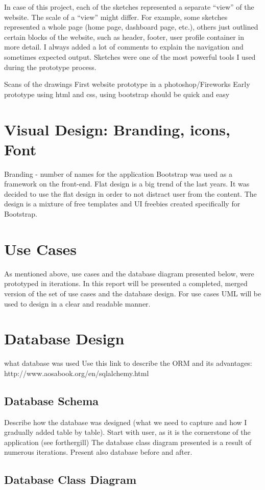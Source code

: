 In case of this project, each of the sketches represented a separate “view” of the website. The scale of a “view” might differ. For example, some sketches represented a whole page (home page, dashboard page, etc.), others just outlined certain blocks of the website, such as header, footer, user profile container in more detail. I always added a lot of comments to explain the navigation and sometimes expected output. Sketches were one of the most powerful tools I used during the prototype process. 


Scans of the drawings
First website prototype in a photoshop/Fireworks
Early prototype using html and css, using bootstrap should be quick and easy

\section{Visual Design: Branding, icons, Font}
\label{sec:visdesign}
Branding - number of names for the application
Bootstrap was used as a framework on the front-end.
Flat design is a big trend of the last years. It was decided to use the flat design in order to not distract user from the content.
The design is a mixture of free templates and UI freebies created specifically for Bootstrap.

\section{Use Cases}
\label{usecases}
As mentioned above, use cases and the database diagram presented below, were prototyped in iterations. In this report will be presented a completed, merged version of the set of use cases and the database design. For use cases UML will be used to design in a clear and readable manner.

\section{Database Design}
\label{databasedesign}
what database was used
Use this link to describe the ORM and its advantages: 
http://www.aosabook.org/en/sqlalchemy.html

\subsection{Database Schema}
Describe how the database was designed (what we need to capture and how I gradually added table by table). Start with user, as it is the cornerstone of the application (see forthergill)
The database class diagram presented is a result of numerous iterations.  
Present also database before and after.

\subsection{Database Class Diagram}

